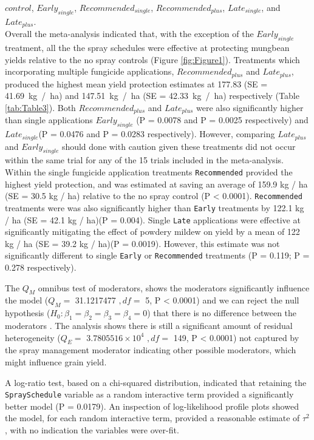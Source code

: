 \documentclass[agronomy,article,submit,moreauthors,pdftex]{mdpi}
\begin{document}
\(control\), \(Early_{single}\), \(Recommended_{single}\), \(Recommended_{plus}\), \(Late_{single}\), and \(Late_{plus}\).\\
Overall the meta-analysis indicated that, with the exception of the \(Early_{single}\) treatment, all the the spray schedules were effective at protecting mungbean yields relative to the no spray controls (Figure \ref{fig:Figure1}).
Treatments which incorporating multiple fungicide applications, \(Recommended_{plus}\) and \(Late_{plus}\), produced the highest mean yield protection estimates at 177.83 (SE = 41.69~kg~/~ha) and 147.51~kg~/~ha (SE = 42.33~kg~/~ha) respectively (Table \ref{tab:Table3}).
Both \(Recommended_{plus}\) and \(Late_{plus}\) were also significantly higher than single applications \(Early_{single}\) (P = 0.0078 and P = 0.0025 respectively) and \(Late_{single}\)(P = 0.0476 and P = 0.0283 respectively).
However, comparing \(Late_{plus}\) and \(Early_{single}\) should done with caution given these treatments did not occur within the same trial for any of the 15 trials included in the meta-analysis.
Within the single fungicide application treatments \texttt{Recommended} provided the highest yield protection, and was estimated at saving an average of 159.9 kg / ha (SE = 30.5 kg / ha) relative to the no spray control (P \textless{} 0.0001).
\texttt{Recommended} treatments were was also significantly higher than \texttt{Early} treatments by 122.1 kg / ha (SE = 42.1 kg / ha)(P = 0.004).
Single \texttt{Late} applications were effective at significantly mitigating the effect of powdery mildew on yield by a mean of 122 kg / ha (SE = 39.2 kg / ha)(P = 0.0019).
However, this estimate was not significantly different to single \texttt{Early} or \texttt{Recommended} treatments (P = 0.119; P = 0.278 respectively).

The \(Q_M\) omnibus test of moderators, shows the moderators significantly influence the model (\(Q_M =\) 31.1217477 \(,df =\) 5, P \textless{} 0.0001) and we can reject the null hypothesis (\(H_0 : \beta_1 = \beta_2 = \beta_3 =\beta_4 = 0\)) that there is no difference between the moderators \citep{Viechtbauer2010}.
The analysis shows there is still a significant amount of residual heterogeneity (\(Q_E =\) \ensuremath{3.7805516\times 10^{4}} \(,df=\) 149, P \textless{} 0.0001) not captured by the spray management moderator indicating other possible moderators, which might influence grain yield.

A log-ratio test, based on a chi-squared distribution, indicated that retaining the \texttt{SpraySchedule} variable as a random interactive term provided a significantly better model (P = 0.0179).
An inspection of log-likelihood profile plots showed the model, for each random interactive term, provided a reasonable estimate of \(\tau^2\), with no indication the variables were over-fit.
\end{document}

